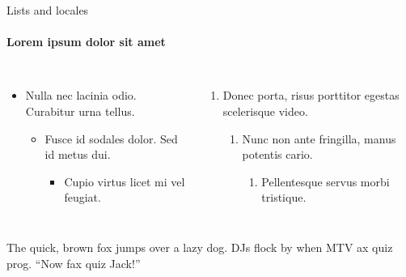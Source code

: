 \documentclass{beamer}
\begin{document}
   
      \begin{frame}[label=lists]{Lists and locales}
         \framesubtitle{Lorem ipsum dolor sit amet}

         \begin{columns}[onlytextwidth]
            
               \begin{itemize}
                  \item Nulla nec lacinia odio. Curabitur urna tellus.

                  \begin{itemize}
                     \item Fusce id sodales dolor. Sed id metus dui.

                     \begin{itemize}
                        \item Cupio virtus licet mi vel feugiat.
                     \end{itemize}

                  \end{itemize}

               \end{itemize}

               \begin{enumerate}
                  \item Donec porta, risus porttitor egestas scelerisque video.
                  
                  \begin{enumerate}
                     \item Nunc non ante fringilla, manus potentis cario.
                  
                     \begin{enumerate}
                        \item Pellentesque servus morbi tristique.
                     \end{enumerate}
                  
                  \end{enumerate}

               \end{enumerate}

         \end{columns}

         \bigskip
         \justifying

         {The quick, brown fox jumps over a lazy
         dog. DJs flock by when MTV ax quiz prog. “Now fax quiz Jack!”}

      \end{frame}
\end{document}
